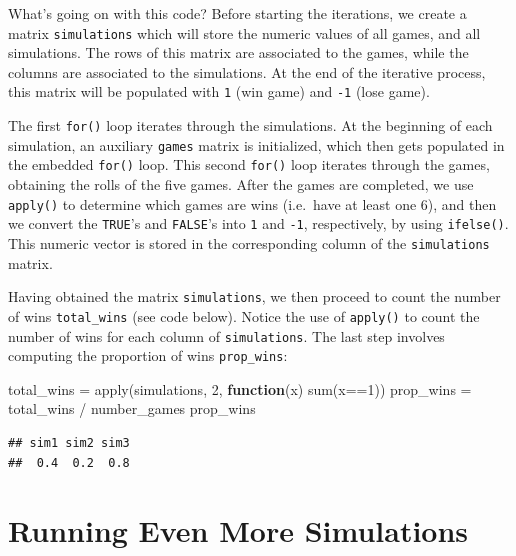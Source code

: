 \documentclass[
]{book}
\newenvironment{Shaded}{\begin{snugshade}}{\end{snugshade}}
\newcommand{\ControlFlowTok}[1]{\textcolor[rgb]{0.13,0.29,0.53}{\textbf{#1}}}
\newcommand{\DecValTok}[1]{\textcolor[rgb]{0.00,0.00,0.81}{#1}}
\newcommand{\FunctionTok}[1]{\textcolor[rgb]{0.00,0.00,0.00}{#1}}
\newcommand{\NormalTok}[1]{#1}
\newcommand{\OtherTok}[1]{\textcolor[rgb]{0.56,0.35,0.01}{#1}}
\newcommand{\SpecialCharTok}[1]{\textcolor[rgb]{0.00,0.00,0.00}{#1}}
\begin{document}
What's going on with this code? Before starting the iterations, we create a
matrix \texttt{simulations} which will store the numeric values of all games, and
all simulations. The rows of this matrix are associated to the games, while
the columns are associated to the simulations. At the end of the iterative
process, this matrix will be populated with \texttt{1} (win game) and \texttt{-1} (lose game).

The first \texttt{for()} loop iterates through the simulations. At the beginning of
each simulation, an auxiliary \texttt{games} matrix is initialized, which then gets
populated in the embedded \texttt{for()} loop. This second \texttt{for()} loop iterates
through the games, obtaining the rolls of the five games.
After the games are completed, we use \texttt{apply()} to determine which games are
wins (i.e.~have at least one 6), and then we convert the \texttt{TRUE}'s and \texttt{FALSE}'s
into \texttt{1} and \texttt{-1}, respectively, by using \texttt{ifelse()}. This numeric vector is
stored in the corresponding column of the \texttt{simulations} matrix.

Having obtained the matrix \texttt{simulations}, we then proceed to count the number
of wins \texttt{total\_wins} (see code below). Notice the use of \texttt{apply()} to count the
number of wins for each column of \texttt{simulations}. The last step involves
computing the proportion of wins \texttt{prop\_wins}:

\begin{Shaded}
\begin{Highlighting}[]
\NormalTok{total\_wins }\OtherTok{=} \FunctionTok{apply}\NormalTok{(simulations, }\DecValTok{2}\NormalTok{, }\ControlFlowTok{function}\NormalTok{(x) }\FunctionTok{sum}\NormalTok{(x}\SpecialCharTok{==}\DecValTok{1}\NormalTok{))}
\NormalTok{prop\_wins }\OtherTok{=}\NormalTok{ total\_wins }\SpecialCharTok{/}\NormalTok{ number\_games}
\NormalTok{prop\_wins}
\end{Highlighting}
\end{Shaded}

\begin{verbatim}
## sim1 sim2 sim3 
##  0.4  0.2  0.8
\end{verbatim}

\hypertarget{running-even-more-simulations}{%
\chapter{Running Even More Simulations}\label{running-even-more-simulations}}
\end{document}
